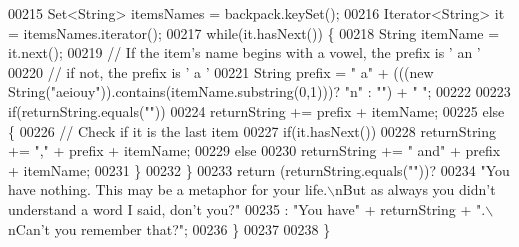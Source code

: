\begin{DoxyCode}
00215         Set<String> itemsNames = backpack.keySet();
00216         Iterator<String> it = itemsNames.iterator();
00217         \textcolor{keywordflow}{while}(it.hasNext()) \{
00218             String itemName = it.next();
00219             \textcolor{comment}{// If the item's name begins with a vowel, the prefix is ' an '}
00220             \textcolor{comment}{// if not, the prefix is ' a '}
00221             String prefix = \textcolor{stringliteral}{" a"} + (((\textcolor{keyword}{new} String(\textcolor{stringliteral}{"aeiouy"})).contains(itemName.substring(0,1)))? \textcolor{stringliteral}{"n"} : \textcolor{stringliteral}{""}) +
       \textcolor{stringliteral}{" "};
00222 
00223             \textcolor{keywordflow}{if}(returnString.equals(\textcolor{stringliteral}{""}))
00224                 returnString += prefix + itemName;
00225             \textcolor{keywordflow}{else} \{
00226                 \textcolor{comment}{// Check if it is the last item}
00227                 \textcolor{keywordflow}{if}(it.hasNext())
00228                     returnString += \textcolor{stringliteral}{","} + prefix + itemName;
00229                 \textcolor{keywordflow}{else}
00230                     returnString += \textcolor{stringliteral}{" and"} + prefix + itemName;
00231             \}
00232         \}
00233         \textcolor{keywordflow}{return} (returnString.equals(\textcolor{stringliteral}{""}))?
00234             \textcolor{stringliteral}{"You have nothing. This may be a metaphor for your life.\(\backslash\)nBut as always you didn't understand a
       word I said, don't you?"}
00235             : \textcolor{stringliteral}{"You have"} + returnString + \textcolor{stringliteral}{".\(\backslash\)nCan't you remember that?"};
00236     \}
00237 
00238 \}
\end{DoxyCode}
